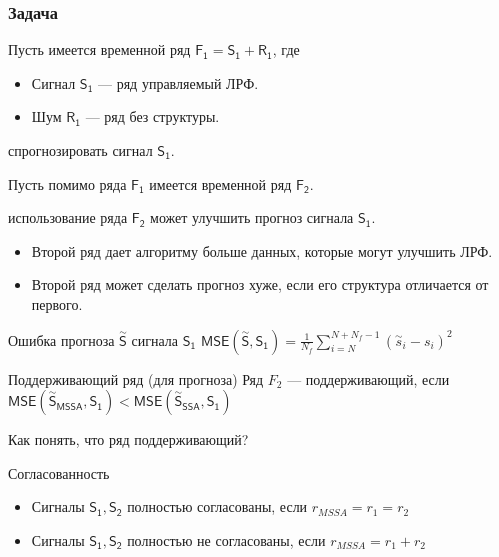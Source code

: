 \documentclass{beamer}
\begin{document}
    \begin{frame}
        \frametitle{Задача}

        Пусть имеется временной ряд $\mathsf{F_1 = S_1 + R_1}$, где
        \begin{itemize}
            \item Сигнал $\mathsf{S_1}$ --- ряд управляемый ЛРФ.
            \item Шум $\mathsf{R_1}$ --- ряд без структуры.
        \end{itemize} 

        спрогнозировать сигнал $\mathsf{S_1}$.

        Пусть помимо ряда $\mathsf{F_1}$ имеется временной ряд $\mathsf{F_2}$.

        использование ряда $\mathsf{F_2}$ может улучшить прогноз сигнала $\mathsf{S_1}$.

        \begin{itemize}
            \item Второй ряд дает алгоритму больше данных, которые могут улучшить ЛРФ.
            \item Второй ряд может сделать прогноз хуже, если его структура отличается от первого.
        \end{itemize}
    \end{frame}
    
    \begin{frame}
        \begin{block}{Ошибка прогноза $\overset{\sim}{\mathsf{S}}$ сигнала $\mathsf{S_1}$}
            $\mathsf{MSE(\overset{\sim}{S}, S_1)} = \frac{1}{N_{f}} \sum_{i = N}^{N + N_{f} - 1} (\overset{\sim}{s}_i - s_i)^2$
        \end{block}

        \begin{block}{Поддерживающий ряд (для прогноза)}
            Ряд $F_2$ --- поддерживающий, если $\mathsf{MSE(\overset{\sim}{S}_{MSSA}, S_1)} < \mathsf{MSE(\overset{\sim}{S}_{SSA}, S_1)}$
        \end{block}

         Как понять, что ряд поддерживающий? 

        \begin{block}{Согласованность}
            \begin{itemize}
                \item Сигналы $\mathsf{S_1, S_2}$ полностью согласованы, если $r_{MSSA} = r_1 = r_2$
                \item Сигналы $\mathsf{S_1, S_2}$ полностью не согласованы, если $r_{MSSA} = r_1 + r_2$
            \end{itemize}
        \end{block}
    \end{frame}
\end{document}
